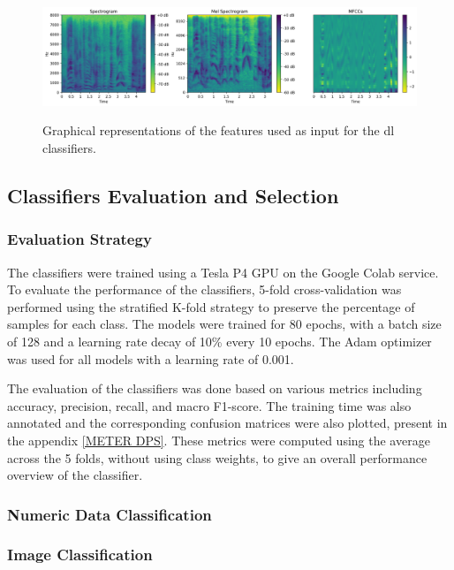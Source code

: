 \begin{figure}[H]
	\centering
	\includegraphics[width=\textwidth]{figs/4_4_deep_learning/features.png}
	\label{fig:dl_features}
	\caption{Graphical representations of the features used as input for the \ac{dl} classifiers.}
\end{figure}



\subsection{Classifiers Evaluation and Selection}

\subsubsection{Evaluation Strategy}

The classifiers were trained using a Tesla P4 GPU on the Google Colab service. To evaluate the performance of the classifiers, 5-fold cross-validation was performed using the stratified K-fold strategy to preserve the percentage of samples for each class. The models were trained for 80 epochs, with a batch size of 128 and a learning rate decay of 10\% every 10 epochs. The Adam optimizer was used for all models with a learning rate of 0.001.

The evaluation of the classifiers was done based on various metrics including accuracy, precision, recall, and macro F1-score. The training time was also annotated and the corresponding confusion matrices were also plotted, present in the appendix \ref{METER DPS}. These metrics were computed using the average across the 5 folds, without using class weights, to give an overall performance overview of the classifier.

\subsubsection{Numeric Data Classification}


\subsubsection{Image Classification}

